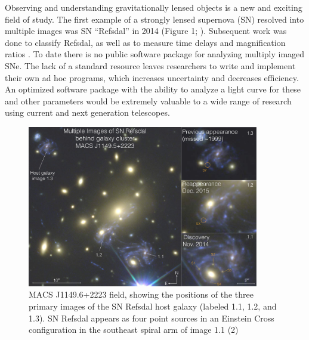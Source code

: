 \thispagestyle{fancy}
\lhead{}
\rhead{}
\renewcommand{\headrulewidth}{1pt}
\renewcommand{\footrulewidth}{0pt}
\newcommand{\packageName}{\textit{SNTD}}
\fancyfoot[C]{}

\pagestyle{fancy}

Observing and understanding gravitationally lensed objects is a new
and exciting field of study. The first example of a strongly lensed
supernova (SN) resolved into multiple images was SN ``Refsdal'' in
2014 (Figure 1; \citet{Kelly:2015a}). Subsequent work was done to
classify Refsdal, as well as to measure time delays and magnification
ratios \citep{Kelly:2016,Rodney:2016}. To date there is no public software 
package for analyzing multiply imaged SNe. The lack of a standard resource
leaves researchers to write and implement their own ad hoc programs,
which increases uncertainty and decreases efficiency. An optimized software package with the ability to analyze a light
curve for these and other parameters would be extremely valuable to a
wide range of research using current and next generation telescopes.

\begin{figure}[h]
\centering
\includegraphics[width=0.9\textwidth]{refsdal_rodney.pdf}
\caption{
MACS J1149.6+2223 field, showing the positions of the three primary
images of the SN Refsdal host galaxy (labeled 1.1, 1.2, and 1.3). SN
Refsdal appears as four point sources in an Einstein Cross
configuration in the southeast spiral arm of image 1.1 (2)}
\end{figure}


